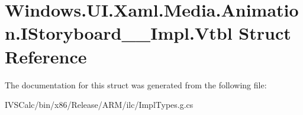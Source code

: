 \hypertarget{struct_windows_1_1_u_i_1_1_xaml_1_1_media_1_1_animation_1_1_i_storyboard_____impl_1_1_vtbl}{}\section{Windows.\+U\+I.\+Xaml.\+Media.\+Animation.\+I\+Storyboard\+\_\+\+\_\+\+Impl.\+Vtbl Struct Reference}
\label{struct_windows_1_1_u_i_1_1_xaml_1_1_media_1_1_animation_1_1_i_storyboard_____impl_1_1_vtbl}


The documentation for this struct was generated from the following file\+:\begin{DoxyCompactItemize}
\item 
I\+V\+S\+Calc/bin/x86/\+Release/\+A\+R\+M/ilc/Impl\+Types.\+g.\+cs\end{DoxyCompactItemize}
